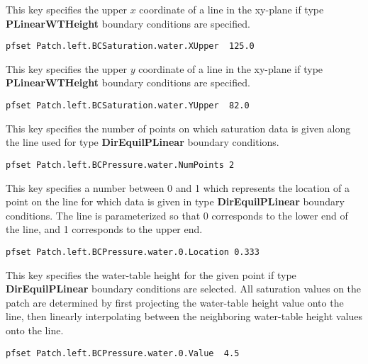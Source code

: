 {
This key specifies the upper $x$ coordinate of a line in the xy-plane if
type {\bf PLinearWTHeight} boundary conditions are specified.
}
\begin{display}\begin{verbatim}
pfset Patch.left.BCSaturation.water.XUpper  125.0
\end{verbatim}\end{display}

{
This key specifies the upper $y$ coordinate of a line in the xy-plane if
type {\bf PLinearWTHeight} boundary conditions are specified.
}
\begin{display}\begin{verbatim}
pfset Patch.left.BCSaturation.water.YUpper  82.0
\end{verbatim}\end{display}

{
This key specifies the number of points on which saturation data is
given along the line used for type {\bf DirEquilPLinear} boundary
conditions.
}
\begin{display}\begin{verbatim}
pfset Patch.left.BCPressure.water.NumPoints 2
\end{verbatim}\end{display}

{
This key specifies a number between 0 and 1 which represents the
location of a point on the line for which data is given in type
{\bf DirEquilPLinear} boundary conditions.  The line is parameterized
so that  0 corresponds to the lower end of the line, and 1 corresponds
to the upper end.
}
\begin{display}\begin{verbatim}
pfset Patch.left.BCPressure.water.0.Location 0.333
\end{verbatim}\end{display}

{
This key specifies the water-table height for the given point if type
{\bf DirEquilPLinear} boundary conditions are selected.  All saturation
values on the patch are determined by first projecting the water-table 
height value onto the line, then linearly interpolating between the
neighboring water-table height values onto the line.
}
\begin{display}\begin{verbatim}
pfset Patch.left.BCPressure.water.0.Value  4.5
\end{verbatim}\end{display}

